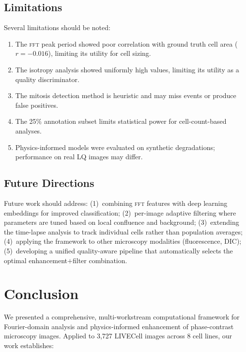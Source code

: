 \documentclass[11pt,a4paper]{article}
\newcommand{\fft}{\textsc{fft}\xspace}
\begin{document}
\subsection{Limitations}

Several limitations should be noted:
\begin{enumerate}[nosep]
    \item The \fft peak period showed poor correlation with ground truth
          cell area ($r{=}{-}0.016$), limiting its utility for cell sizing.
    \item The isotropy analysis showed uniformly high values, limiting its
          utility as a quality discriminator.
    \item The mitosis detection method is heuristic and may miss events
          or produce false positives.
    \item The 25\% annotation subset limits statistical power for
          cell-count-based analyses.
    \item Physics-informed models were evaluated on synthetic degradations;
          performance on real LQ images may differ.
\end{enumerate}

\subsection{Future Directions}

Future work should address: (1)~combining \fft features with deep learning
embeddings for improved classification; (2)~per-image adaptive filtering
where parameters are tuned based on local confluence and background;
(3)~extending the time-lapse analysis to track individual cells rather
than population averages; (4)~applying the framework to other microscopy
modalities (fluorescence, DIC); (5)~developing a unified
quality-aware pipeline that automatically selects the optimal
enhancement$+$filter combination.

\section{Conclusion}
\label{sec:conclusion}

We presented a comprehensive, multi-workstream computational framework for
Fourier-domain analysis and physics-informed enhancement of phase-contrast
microscopy images. Applied to 3,727 LIVECell images across 8 cell lines,
our work establishes:
\end{document}
